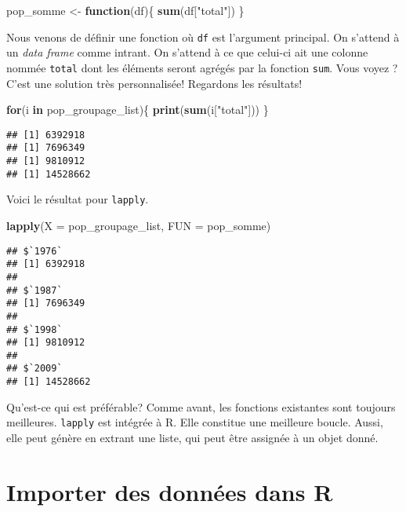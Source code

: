 \documentclass[]{book}
\newenvironment{Shaded}{\begin{snugshade}}{\end{snugshade}}
\newcommand{\KeywordTok}[1]{\textcolor[rgb]{0.13,0.29,0.53}{\textbf{#1}}}
\newcommand{\DataTypeTok}[1]{\textcolor[rgb]{0.13,0.29,0.53}{#1}}
\newcommand{\StringTok}[1]{\textcolor[rgb]{0.31,0.60,0.02}{#1}}
\newcommand{\ControlFlowTok}[1]{\textcolor[rgb]{0.13,0.29,0.53}{\textbf{#1}}}
\newcommand{\NormalTok}[1]{#1}
\begin{document}
\begin{Shaded}
\begin{Highlighting}[]
\NormalTok{pop_somme <-}\StringTok{ }\ControlFlowTok{function}\NormalTok{(df)\{}
  \KeywordTok{sum}\NormalTok{(df[}\StringTok{"total"}\NormalTok{])}
\NormalTok{  \}}
\end{Highlighting}
\end{Shaded}

Nous venons de définir une fonction où \texttt{df} est l'argument
principal. On s'attend à un \emph{data frame} comme intrant. On s'attend
à ce que celui-ci ait une colonne nommée \texttt{total} dont les
éléments seront agrégés par la fonction \texttt{sum}. Vous voyez ? C'est
une solution très personnalisée! Regardons les résultats!

\begin{Shaded}
\begin{Highlighting}[]
\ControlFlowTok{for}\NormalTok{(i }\ControlFlowTok{in}\NormalTok{ pop_groupage_list)\{}
  \KeywordTok{print}\NormalTok{(}\KeywordTok{sum}\NormalTok{(i[}\StringTok{"total"}\NormalTok{]))}
\NormalTok{\}}
\end{Highlighting}
\end{Shaded}

\begin{verbatim}
## [1] 6392918
## [1] 7696349
## [1] 9810912
## [1] 14528662
\end{verbatim}

Voici le résultat pour \texttt{lapply}.

\begin{Shaded}
\begin{Highlighting}[]
\KeywordTok{lapply}\NormalTok{(}\DataTypeTok{X =}\NormalTok{ pop_groupage_list, }\DataTypeTok{FUN =}\NormalTok{ pop_somme)}
\end{Highlighting}
\end{Shaded}

\begin{verbatim}
## $`1976`
## [1] 6392918
## 
## $`1987`
## [1] 7696349
## 
## $`1998`
## [1] 9810912
## 
## $`2009`
## [1] 14528662
\end{verbatim}

Qu'est-ce qui est préférable? Comme avant, les fonctions existantes sont
toujours meilleures. \texttt{lapply} est intégrée à R. Elle constitue
une meilleure boucle. Aussi, elle peut génère en extrant une liste, qui
peut être assignée à un objet donné.

\chapter{Importer des données dans R}\label{importer-des-donnees-dans-r}
\end{document}

